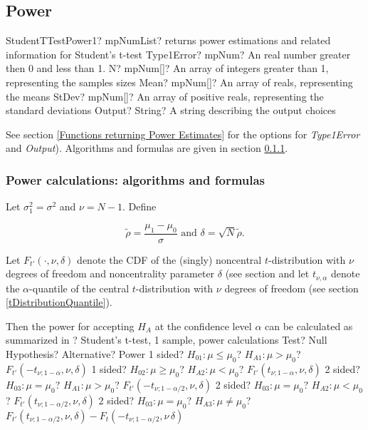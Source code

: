 \newpage
\subsection{Power}

\begin{mpFunctionsExtract}
	\mpFunctionFiveNotImplemented
	{StudentTTestPower1? mpNumList? returns power estimations and related information for Student's t-test}
	{Type1Error? mpNum? An real number greater then 0 and less than 1.}
	{N? mpNum[]? An array of integers greater than 1, representing the samples sizes}
	{Mean? mpNum[]? An array of reals, representing the means}
	{StDev? mpNum[]? An array of positive reals, representing the standard deviations}
	{Output? String? A string describing the output choices}
\end{mpFunctionsExtract}

\vspace{0.3cm}
See section \ref{Functions returning Power Estimates} for the options for {\itshape\sffamily Type1Error} and {\itshape\sffamily Output}). Algorithms and formulas are given in section \ref{1SampleTTest_Power}.


\subsubsection{Power calculations: algorithms and formulas}
\label{1SampleTTest_Power}
Let $\sigma_1^2 = \sigma^2$ and $\nu=N-1$. Define

\begin{equation} \label{eq:TTestPower1}
	\widetilde{\rho} = \frac{\mu_1-\mu_0}{\sigma} \text{ and } \delta = \sqrt{N} \widetilde{\rho}.
\end{equation}



\vspace{0.3cm}
Let $F_{t'}\left(\cdot, \nu, \delta \right)$ denote the CDF of the (singly) noncentral $t$-distribution with $\nu$ degrees of freedom and noncentrality parameter $\delta$ (see section 
and let $t_{\nu,\alpha}$ denote the $\alpha$-quantile of the central $t$-distribution with $\nu$ degrees of freedom (see section \ref{tDistributionQuantile}).


\mpTableFourColsTwoRowsThreeRows
{Then the power for accepting $H_A$ at the confidence level $\alpha$ can be calculated as summarized in ? Student's t-test, 1 sample, power calculations}
{Test? Null Hypothesis? Alternative? Power}
{1 sided? $H_{01}: \mu \leq \mu_0$? $H_{A1}: \mu > \mu_0$? $F_{t'}\left(-t_{\nu;1-\alpha}, \nu, \delta \right)$}
{1 sided? $H_{02}: \mu \geq \mu_0$? $H_{A2}: \mu < \mu_0$? $F_{t'}\left(t_{\nu;1-\alpha}, \nu, \delta \right)$}
{2 sided? $H_{03}: \mu = \mu_0$? $H_{A1}: \mu > \mu_0$? $F_{t'}\left(-t_{\nu;1-\alpha/2}, \nu, \delta \right)$}
{2 sided? $H_{03}: \mu = \mu_0$? $H_{A2}: \mu < \mu_0$? $F_{t'}\left(t_{\nu;1-\alpha/2}, \nu, \delta \right)$}
{2 sided? $H_{03}: \mu = \mu_0$? $H_{A3}: \mu \neq \mu_0$? $F_{t'}\left(t_{\nu;1-\alpha/2}, \nu, \delta \right)-F_t\left(-t_{\nu;1-\alpha/2}, \nu\, \delta \right)$}


